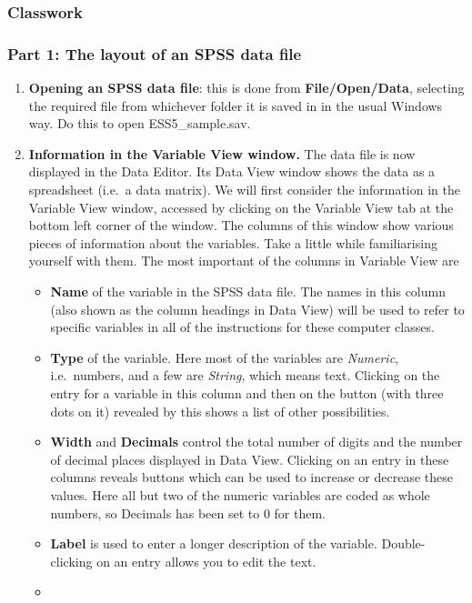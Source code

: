 \subsubsection{Classwork}

\subsubsection{Part 1: The layout of an SPSS data file}

\begin{enumerate}
\item
\textbf{Opening an SPSS data file}: this is done from
\textbf{File/Open/Data}, selecting the required file from whichever folder it is
saved in in the usual Windows way. Do this to open ESS5\_sample.sav.
\item
\textbf{Information in the Variable View window.} The data file is now
displayed in the Data Editor. Its Data View window shows the data as a
spreadsheet (i.e.\ a data matrix). We will first consider the
information in the Variable View window, accessed by clicking on the
Variable View tab at the bottom left corner of the window. The columns
of this window show various pieces of information about the variables.
Take a little while familiarising yourself with them. The most important
of the columns in Variable View are
\begin{itemize}
\item
\textbf{Name} of the variable in the SPSS data file. The names in this
column (also shown as the column headings in Data View) will be
used to refer to specific variables in all of the instructions for these
computer classes.
\item
\textbf{Type} of the variable. Here most of the variables are
\emph{Numeric}, i.e.\ numbers, and a few are
\emph{String}, which means text.
Clicking on the entry for a variable in
this column and then on the button (with three dots on it) revealed by
this shows a list of other possibilities.
\item
\textbf{Width} and \textbf{Decimals} control the total number of digits
and the number of decimal places displayed in Data View. Clicking on
an entry in these columns reveals buttons which can be used to increase
or decrease these values.
Here all but two of the numeric variables are coded as whole numbers, so
Decimals has been set to 0 for them.
\item
\textbf{Label} is used to enter a longer description of the variable.
Double-clicking on an entry allows you to edit the text.
\item

\end{itemize}
\end{enumerate}
